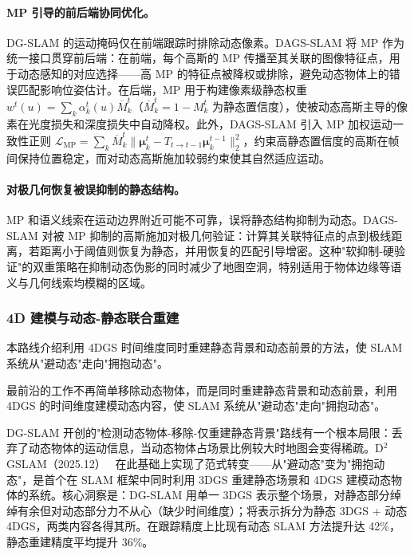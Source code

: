 \paragraph{MP 引导的前后端协同优化。}
DG-SLAM 的运动掩码仅在前端跟踪时排除动态像素。DAGS-SLAM 将 MP 作为统一接口贯穿前后端：在前端，每个高斯的 MP 传播至其关联的图像特征点，用于动态感知的对应选择——高 MP 的特征点被降权或排除，避免动态物体上的错误匹配影响位姿估计。在后端，MP 用于构建像素级静态权重 $w^t(u) = \sum_k \alpha_k^t(u) \overline{M}_k^t$（$\overline{M}_k^t = 1 - M_k^t$ 为静态置信度），使被动态高斯主导的像素在光度损失和深度损失中自动降权。此外，DAGS-SLAM 引入 MP 加权运动一致性正则 $\mathcal{L}_{\mathrm{MP}} = \sum_k \overline{M}_k^t \|\boldsymbol{\mu}_k^t - T_{t \to t-1} \boldsymbol{\mu}_k^{t-1}\|_2^2$，约束高静态置信度的高斯在帧间保持位置稳定，而对动态高斯施加较弱约束使其自然适应运动。

\paragraph{对极几何恢复被误抑制的静态结构。}
MP 和语义线索在运动边界附近可能不可靠，误将静态结构抑制为动态。DAGS-SLAM 对被 MP 抑制的高斯施加对极几何验证：计算其关联特征点的点到极线距离，若距离小于阈值则恢复为静态，并用恢复的匹配引导增密。这种"软抑制-硬验证"的双重策略在抑制动态伪影的同时减少了地图空洞，特别适用于物体边缘等语义与几何线索均模糊的区域。

\subsubsection{4D 建模与动态-静态联合重建}

本路线介绍利用 4DGS 时间维度同时重建静态背景和动态前景的方法，使 SLAM 系统从"避动态"走向"拥抱动态"。

最前沿的工作不再简单移除动态物体，而是同时重建静态背景和动态前景，利用 4DGS 的时间维度建模动态内容，使 SLAM 系统从"避动态"走向"拥抱动态"。

DG-SLAM 开创的"检测动态物体-移除-仅重建静态背景"路线有一个根本局限：丢弃了动态物体的运动信息，当动态物体占场景比例较大时地图会变得稀疏。D$^2$GSLAM（2025.12）~\cite{2512_09411} 在此基础上实现了范式转变——从"避动态"变为"拥抱动态"，是首个在 SLAM 框架中同时利用 3DGS 重建静态场景和 4DGS 建模动态物体的系统。核心洞察是：DG-SLAM 用单一 3DGS 表示整个场景，对静态部分绰绰有余但对动态部分力不从心（缺少时间维度）；将表示拆分为静态 3DGS + 动态 4DGS，两类内容各得其所。在跟踪精度上比现有动态 SLAM 方法提升达 42\%，静态重建精度平均提升 36\%。

